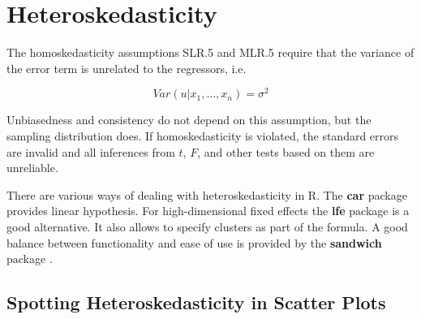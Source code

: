 \documentclass[]{book}
\newenvironment{Shaded}{\begin{snugshade}}{\end{snugshade}}
\newcommand{\DataTypeTok}[1]{\textcolor[rgb]{0.13,0.29,0.53}{#1}}
\newcommand{\KeywordTok}[1]{\textcolor[rgb]{0.13,0.29,0.53}{\textbf{#1}}}
\newcommand{\NormalTok}[1]{#1}
\newcommand{\OperatorTok}[1]{\textcolor[rgb]{0.81,0.36,0.00}{\textbf{#1}}}
\newcommand{\StringTok}[1]{\textcolor[rgb]{0.31,0.60,0.02}{#1}}
\begin{document}
\hypertarget{heteroskedasticity}{%
\section{Heteroskedasticity}\label{heteroskedasticity}}

The homoskedasticity assumptions SLR.5 and MLR.5 require that the variance of the error term is unrelated to the regressors, i.e.

\begin{equation}
Var(u|x_1, \dots , x_n) = \sigma^2  
\end{equation}

Unbiasedness and consistency do not depend on this assumption, but the sampling distribution does. If homoskedasticity is violated, the standard errors are invalid and all inferences from \(t\), \(F\), and other tests based on them are unreliable.

There are various ways of dealing with heteroskedasticity in R. The \textbf{car} package provides linear hypothesis.
For high-dimensional fixed effects the \textbf{lfe} package is a good alternative. It also allows to specify clusters as part of the formula.
A good balance between functionality and ease of use is provided by the \textbf{sandwich} package \citet{Zeileis2017}.

\hypertarget{spotting-heteroskedasticity-in-scatter-plots}{%
\subsection{Spotting Heteroskedasticity in Scatter Plots}\label{spotting-heteroskedasticity-in-scatter-plots}}

\begin{Shaded}
\end{Shaded}
\end{document}
